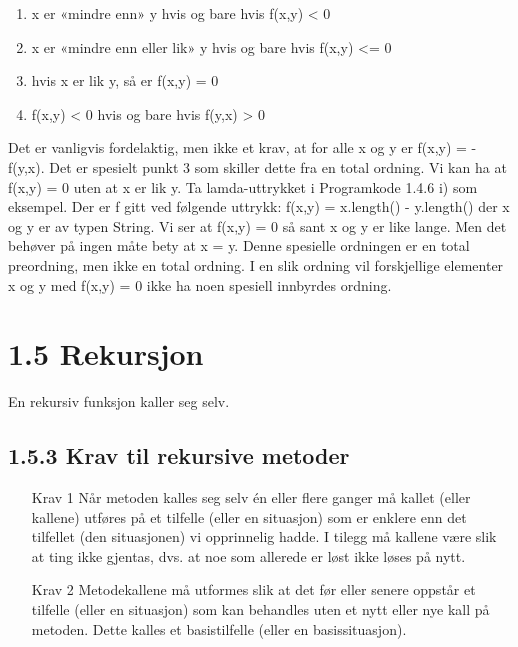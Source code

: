 \documentclass[11pt]{article}
\begin{document}
            \begin{enumerate}
                \item x er «mindre enn» y hvis og bare hvis f(x,y) < 0
                \item x er «mindre enn eller lik» y hvis og bare hvis f(x,y) <= 0
                \item hvis x er lik y, så er f(x,y) = 0
                \item f(x,y) < 0 hvis og bare hvis f(y,x) > 0
            \end{enumerate}

            Det er vanligvis fordelaktig, men ikke et krav, at for alle x og y er f(x,y) = -f(y,x). Det er
            spesielt punkt 3 som skiller dette fra en total ordning. Vi kan ha at f(x,y) = 0 uten at x er
            lik y. Ta lamda-uttrykket i Programkode 1.4.6 i) som eksempel. Der er f gitt ved følgende
            uttrykk: f(x,y) = x.length() - y.length() der x og y er av typen String. Vi ser at f(x,y)
            = 0 så sant x og y er like lange. Men det behøver på ingen måte bety at x = y. Denne
            spesielle ordningen er en total preordning, men ikke en total ordning. I en slik ordning
            vil forskjellige elementer x og y med f(x,y) = 0 ikke ha noen spesiell innbyrdes ordning. 

\newpage
\section{1.5 Rekursjon}
    En rekursiv funksjon kaller seg selv.

    \subsection{1.5.3 Krav til rekursive metoder}

        \begin{enumerate}
            \item[Krav 1] Når metoden kalles seg selv én eller flere ganger må kallet (eller
                kallene) utføres på et tilfelle (eller en situasjon) som er enklere enn det tilfellet
                (den situasjonen) vi opprinnelig hadde. I tilegg må kallene være slik at ting ikke
                gjentas, dvs. at noe som allerede er løst ikke løses på nytt.

            \item[Krav 2] Metodekallene må utformes slik at det før eller senere oppstår et tilfelle
                (eller en situasjon) som kan behandles uten et nytt eller nye kall på metoden.
                Dette kalles et basistilfelle (eller en basissituasjon).
        \end{enumerate}
\end{document}
